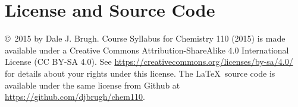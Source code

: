 \documentclass[letterpaper,oneside,onecolumn,11pt,article]{memoir}
\begin{document}
\section{License and Source Code}
\copyright\ 2015 by Dale J. Brugh. Course Syllabus for Chemistry 110 (2015) is made available under a Creative Commons Attribution-ShareAlike 4.0 International License (CC BY-SA 4.0). See \href{https://creativecommons.org/licenses/by-sa/4.0/}{https://creativecommons.org/licenses/by-sa/4.0/} for details about your rights under this license. The \LaTeX\ source code is available under the same license from Github at \href{https://github.com/djbrugh/chem110}{https://github.com/djbrugh/chem110}. 
%
%
\end{document}
